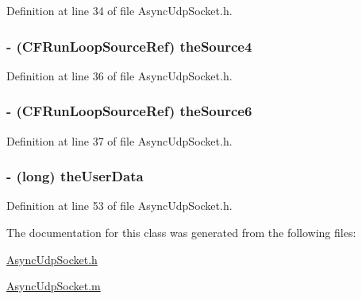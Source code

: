 Definition at line 34 of file AsyncUdpSocket.h.

\hypertarget{interface_async_udp_socket_a11ed80b25840f9c2e1fb11fb81516e9f}{
\subsubsection[{theSource4}]{\setlength{\rightskip}{0pt plus 5cm}-\/ (CFRunLoopSourceRef) {\bf theSource4}}}
\label{interface_async_udp_socket_a11ed80b25840f9c2e1fb11fb81516e9f}


Definition at line 36 of file AsyncUdpSocket.h.

\hypertarget{interface_async_udp_socket_afa4beb0b77a9fc1de8e37e665ef8ab99}{
\subsubsection[{theSource6}]{\setlength{\rightskip}{0pt plus 5cm}-\/ (CFRunLoopSourceRef) {\bf theSource6}}}
\label{interface_async_udp_socket_afa4beb0b77a9fc1de8e37e665ef8ab99}


Definition at line 37 of file AsyncUdpSocket.h.

\hypertarget{interface_async_udp_socket_af6dc350be3ed36a9ea2bd10580c263d2}{
\subsubsection[{theUserData}]{\setlength{\rightskip}{0pt plus 5cm}-\/ (long) {\bf theUserData}}}
\label{interface_async_udp_socket_af6dc350be3ed36a9ea2bd10580c263d2}


Definition at line 53 of file AsyncUdpSocket.h.



The documentation for this class was generated from the following files:\begin{DoxyCompactItemize}
\item 
\hyperlink{_async_udp_socket_8h}{AsyncUdpSocket.h}\item 
\hyperlink{_async_udp_socket_8m}{AsyncUdpSocket.m}\end{DoxyCompactItemize}
